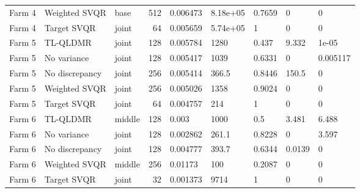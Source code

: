 \begin{table}[pos=t,width=\FullWidth]
\begin{tabular}{lllrlllll}
Farm 4 & Weighted SVQR & base & 512 & 0.006473 & 8.18e+05 & 0.7659 & 0 & 0 \\
Farm 4 & Target SVQR & joint & 64 & 0.005659 & 5.74e+05 & 1 & 0 & 0 \\
Farm 5 & TL-QLDMR & joint & 128 & 0.005784 & 1280 & 0.437 & 9.332 & 1e-05 \\
Farm 5 & No variance & joint & 128 & 0.005417 & 1039 & 0.6331 & 0 & 0.005117 \\
Farm 5 & No discrepancy & joint & 256 & 0.005414 & 366.5 & 0.8446 & 150.5 & 0 \\
Farm 5 & Weighted SVQR & joint & 256 & 0.005026 & 1358 & 0.9024 & 0 & 0 \\
Farm 5 & Target SVQR & joint & 64 & 0.004757 & 214 & 1 & 0 & 0 \\
Farm 6 & TL-QLDMR & middle & 128 & 0.003 & 1000 & 0.5 & 3.481 & 6.488 \\
Farm 6 & No variance & joint & 128 & 0.002862 & 261.1 & 0.8228 & 0 & 3.597 \\
Farm 6 & No discrepancy & joint & 128 & 0.004777 & 393.7 & 0.6344 & 0.0139 & 0 \\
Farm 6 & Weighted SVQR & middle & 256 & 0.01173 & 100 & 0.2087 & 0 & 0 \\
Farm 6 & Target SVQR & joint & 32 & 0.001373 & 9714 & 1 & 0 & 0 \\
\bottomrule
\end{tabular}
\end{table}

